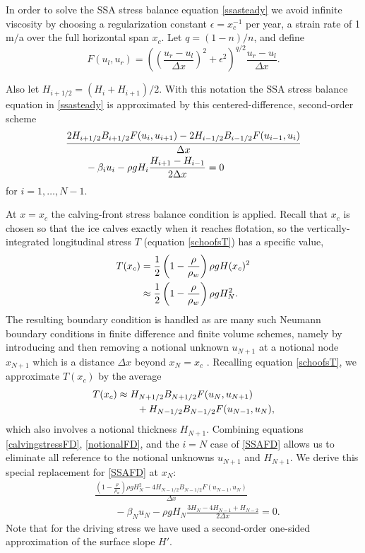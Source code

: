 \documentclass[twocolumn,letterpaper]{igs}
\newcommand{\eps}{\epsilon}
\begin{document}
In order to solve the SSA stress balance equation \eqref{ssasteady} we avoid infinite viscosity by choosing a regularization constant $\eps=x_c^{-1}$ per year, a strain rate of 1 m$/$a over the full horizontal span $x_c$.  Let $q = (1-n)/n$, and define
\begin{equation}
F(u_l,u_r) = \left(\left(\frac{u_r-u_l}{\Delta x}\right)^2 + \eps^2\right)^{q/2} \frac{u_r-u_l}{\Delta x}.  \label{viscregFD}
\end{equation}

Also let $H_{i+1/2} = (H_i+H_{i+1})/2$.  With this notation the SSA stress balance equation in \eqref{ssasteady} is approximated by this centered-difference, second-order scheme
\begin{align}
&\frac{2 H_{i+1/2} B_{i+1/2} F(u_i,u_{i+1}) - 2 H_{i-1/2} B_{i-1/2} F(u_{i-1},u_i)}{\Delta x} \notag \\
&\qquad - \beta_i u_i - \rho g H_i \frac{H_{i+1}-H_{i-1}}{2\Delta x} = 0  \label{SSAFD}
\end{align}
for $i=1,\dots,N-1$.

At $x=x_c$ the calving-front stress balance condition is applied.  Recall that $x_c$ is chosen so that the ice calves exactly when it reaches flotation, so the vertically-integrated longitudinal stress $T$ (equation \eqref{schoofsT}) has a specific value,
\begin{align}
T(x_c) &= \frac{1}{2} \left(1 - \frac{\rho}{\rho_w}\right) \rho g H(x_c)^2 \notag \\
   &\approx \frac{1}{2} \left(1 - \frac{\rho}{\rho_w}\right) \rho g H_N^2. \label{calvingstressFD}
\end{align}
The resulting boundary condition is handled as are many such Neumann boundary conditions in finite difference and finite volume schemes, namely by introducing and then removing a notional unknown $u_{N+1}$ at a notional node $x_{N+1}$ which is a distance $\Delta x$ beyond $x_N=x_c$ \citep{MortonMayers}.  Recalling equation \eqref{schoofsT}, we approximate $T(x_c)$ by the average
\begin{align}
T(x_c) &\approx H_{N+1/2} B_{N+1/2} F(u_N,u_{N+1}) \notag \\
  &\qquad+ H_{N-1/2} B_{N-1/2} F(u_{N-1},u_{N}),\label{notionalFD}
\end{align}
which also involves a notional thickness $H_{N+1}$.  Combining equations \eqref{calvingstressFD}, \eqref{notionalFD}, and the $i=N$ case of \eqref{SSAFD} allows us to eliminate all reference to the notional unknowns $u_{N+1}$ and $H_{N+1}$.  We derive this special replacement for \eqref{SSAFD} at $x_N$:
\begin{align*}
&\frac{\left(1 - \frac{\rho}{\rho_w}\right) \rho g H_N^2 - 4 H_{N-1/2} B_{N-1/2} F(u_{N-1},u_N)}{\Delta x} \\
&\qquad - \beta_N u_N - \rho g H_N \frac{3 H_N - 4H_{N-1} + H_{N-2}}{2\Delta x} = 0.
\end{align*}
Note that for the driving stress we have used a second-order one-sided approximation of the surface slope $H'$.
\end{document}
